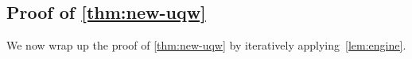 

\subsection{Proof of \cref{thm:new-uqw}}
We now wrap up the proof of \cref{thm:new-uqw} by iteratively applying~\cref{lem:engine}.

